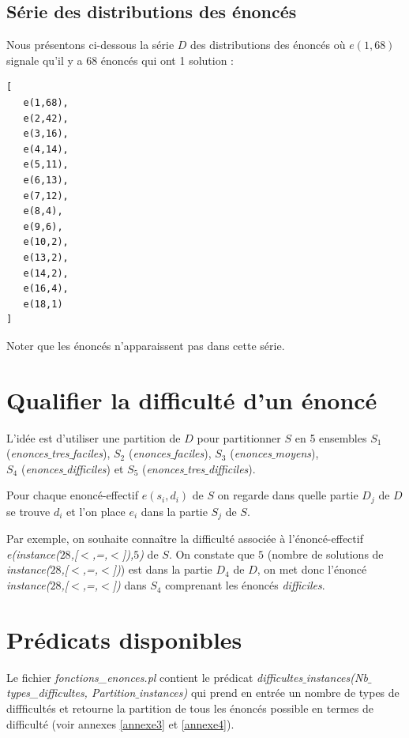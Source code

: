 \documentclass[a4paper, 12]{article}
\begin{document}
\subsection{Série des distributions des énoncés}
Nous présentons ci-dessous la série $D$ des distributions des énoncés où $e(1,68)$ signale qu'il y a 68 énoncés qui ont 1 solution :
\begin{verbatim}
[
   e(1,68),
   e(2,42),
   e(3,16),
   e(4,14),
   e(5,11),
   e(6,13),
   e(7,12),
   e(8,4),
   e(9,6),
   e(10,2),
   e(13,2),
   e(14,2),
   e(16,4),
   e(18,1)
]
\end{verbatim}

Noter que les énoncés n'apparaissent pas dans cette série.


\section{Qualifier la difficulté d'un énoncé}


L'idée est d'utiliser une partition de $D$ pour partitionner $S$ en 5 ensembles $S_1$ (\emph{enonces$\_$tres$\_$faciles}), $S_2$ (\emph{enonces$\_$faciles}), $S_3$ (\emph{enonces$\_$moyens}),\\  $S_4$ (\emph{enonces$\_$difficiles}) et 
$S_5$ (\emph{enonces$\_$tres$\_$difficiles}).

Pour chaque enoncé-effectif $e(s_i, d_i)$ de $S$ on regarde dans quelle partie $D_j$ de $D$ se trouve $d_i$ et l'on place $e_i$ dans la partie $S_j$ de $S$. 

Par exemple, on souhaite connaître la difficulté associée à l'énoncé-effectif \emph{e(instance($28$,[$<$,=,$<$]),$5$)} de $S$. On constate que $5$ (nombre de solutions de \emph{instance($28$,[$<$,=,$<$])}) est dans la partie $D_4$ de $D$, on met donc l'énoncé
\\ \emph{instance($28$,[$<$,=,$<$])} dans $S_4$ comprenant les énoncés \emph{difficiles}.


\section{Prédicats disponibles}

Le fichier \emph{fonctions\_enonces.pl} contient le prédicat \emph{difficultes$\_$instances(Nb$\_$types\_difficultes, Partition$\_$instances)} qui prend en entrée un nombre de types de diffficultés et retourne la partition de tous les énoncés possible en termes de difficulté (voir annexes \ref{annexe3} et \ref{annexe4}).
\end{document}
